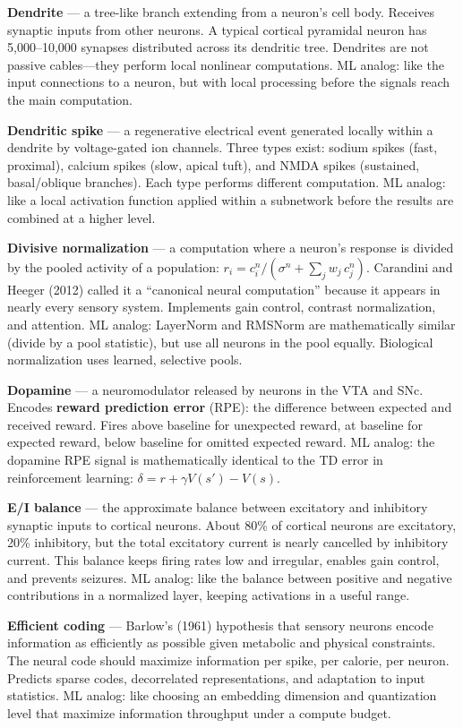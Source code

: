 \documentclass[11pt,a4paper]{article}
\begin{document}
\textbf{Dendrite} --- a tree-like branch extending from a neuron's cell body. Receives synaptic inputs from other neurons. A typical cortical pyramidal neuron has 5,000--10,000 synapses distributed across its dendritic tree. Dendrites are not passive cables---they perform local nonlinear computations. ML analog: like the input connections to a neuron, but with local processing before the signals reach the main computation.

\textbf{Dendritic spike} --- a regenerative electrical event generated locally within a dendrite by voltage-gated ion channels. Three types exist: sodium spikes (fast, proximal), calcium spikes (slow, apical tuft), and NMDA spikes (sustained, basal/oblique branches). Each type performs different computation. ML analog: like a local activation function applied within a subnetwork before the results are combined at a higher level.

\textbf{Divisive normalization} --- a computation where a neuron's response is divided by the pooled activity of a population: $r_i = c_i^n / (\sigma^n + \sum_j w_j\, c_j^n)$. Carandini and Heeger (2012) called it a ``canonical neural computation'' because it appears in nearly every sensory system. Implements gain control, contrast normalization, and attention. ML analog: LayerNorm and RMSNorm are mathematically similar (divide by a pool statistic), but use all neurons in the pool equally. Biological normalization uses learned, selective pools.

\textbf{Dopamine} --- a neuromodulator released by neurons in the VTA and SNc. Encodes \textbf{reward prediction error} (RPE): the difference between expected and received reward. Fires above baseline for unexpected reward, at baseline for expected reward, below baseline for omitted expected reward. ML analog: the dopamine RPE signal is mathematically identical to the TD error in reinforcement learning: $\delta = r + \gamma V(s') - V(s)$.

\textbf{E/I balance} --- the approximate balance between excitatory and inhibitory synaptic inputs to cortical neurons. About 80\% of cortical neurons are excitatory, 20\% inhibitory, but the total excitatory current is nearly cancelled by inhibitory current. This balance keeps firing rates low and irregular, enables gain control, and prevents seizures. ML analog: like the balance between positive and negative contributions in a normalized layer, keeping activations in a useful range.

\textbf{Efficient coding} --- Barlow's (1961) hypothesis that sensory neurons encode information as efficiently as possible given metabolic and physical constraints. The neural code should maximize information per spike, per calorie, per neuron. Predicts sparse codes, decorrelated representations, and adaptation to input statistics. ML analog: like choosing an embedding dimension and quantization level that maximize information throughput under a compute budget.
\end{document}
